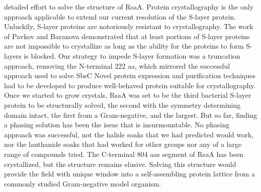  detailed effort to solve the structure of RsaA. Protein crystallography is the only approach applicable to extend our current resolution of the \caulobacter{} \ac{S-layer} protein. Unluckily, \ac{S-layer} proteins are notoriously resistant to crystallography. The work of Pavkov \etal{} and Baranova \etal{} demonstrated that at least portions of \ac{S-layer} proteins are not impossible to crystallize as long as the ability for the proteins to form \acp{S-layer} is blocked. Our strategy to impede \ac{S-layer} formation was a truncation approach, removing the N-terminal 222 \ac{aa}, which mirrored the successful approach used to solve SbsC Novel protein expression and purification techniques had to be developed to produce well-behaved protein suitable for crystallography. Once we started to grow crystals, RsaA was set to be the third bacterial \ac{S-layer} protein to be structurally solved, the second with the symmetry determining domain intact, the first from a Gram-negative, and the largest. But so far, finding a phasing solution has been the issue that is insurmountable. No phasing approach was successful, not the halide soaks that we had predicted would work, nor the lanthanide soaks that had worked for other groups nor any of a large range of  compounds tried. The C-terminal 804 \acp{aa} segment of RsaA has been crystallized, but the structure remains elusive. Solving this structure would provide the field with unique window into a self-assembling protein lattice from a commonly studied Gram-negative model organism. 

